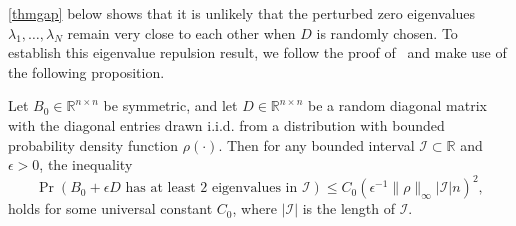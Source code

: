 \documentclass{siamart190516}
\newcommand{\R}{\mathbb{R}}
\providecommand{\abs}[1]{\lvert#1\rvert}
\providecommand{\norm}[1]{\lVert#1\rVert}
\begin{document}
\cref{thmgap} below shows that it is unlikely that the perturbed zero eigenvalues $\lambda_{1}, \dotsc, \lambda_{N}$ remain very close to each other when $D$ is randomly chosen. To establish this eigenvalue repulsion result, we follow the proof of~\cite[Lemma 12]{Meyer2023} and make use of the following proposition.
 \begin{proposition}
    \label{repulsion}
    Let $B_0 \in\R^{n\times n}$ be symmetric, and let $D\in\R^{n\times n}$ be a random diagonal matrix with the diagonal entries drawn i.i.d. from a distribution with bounded probability density function $\rho(\cdot)$. Then for any bounded interval $\mathcal{I}\subset \R$ and $\epsilon > 0$, the inequality
    \begin{equation*}
        \Pr(B_0 + \epsilon D \text{ has at least $2$ eigenvalues in }\mathcal{I})\leq C_0 (\epsilon^{-1} \norm{\rho}_{\infty}\abs{\mathcal{I}}n)^{2},
    \end{equation*}
    holds for some universal constant $C_0$, where $\abs{\mathcal{I}}$ is the length of $\mathcal{I}$.
\end{proposition}
\end{document}
